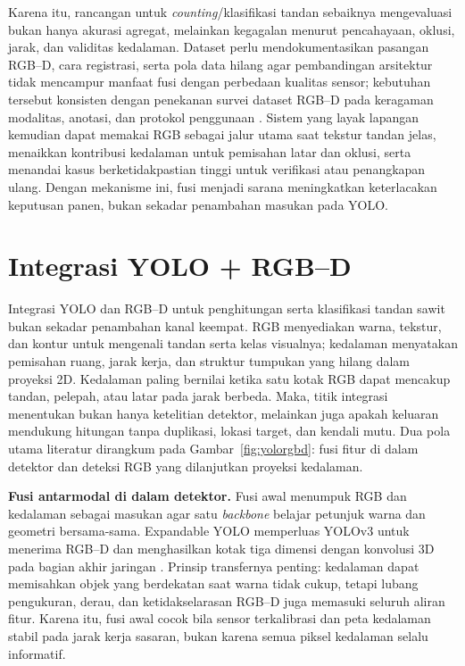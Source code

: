 Karena itu, rancangan untuk \textit{counting}/klasifikasi tandan sebaiknya mengevaluasi bukan hanya akurasi agregat, melainkan kegagalan menurut pencahayaan, oklusi, jarak, dan validitas kedalaman. Dataset perlu mendokumentasikan pasangan RGB--D, cara registrasi, serta pola data hilang agar pembandingan arsitektur tidak mencampur manfaat fusi dengan perbedaan kualitas sensor; kebutuhan tersebut konsisten dengan penekanan survei dataset RGB--D pada keragaman modalitas, anotasi, dan protokol penggunaan \cite{lopes2022rgbddatasets}. Sistem yang layak lapangan kemudian dapat memakai RGB sebagai jalur utama saat tekstur tandan jelas, menaikkan kontribusi kedalaman untuk pemisahan latar dan oklusi, serta menandai kasus berketidakpastian tinggi untuk verifikasi atau penangkapan ulang. Dengan mekanisme ini, fusi menjadi sarana meningkatkan keterlacakan keputusan panen, bukan sekadar penambahan masukan pada YOLO.

\section{Integrasi YOLO + RGB--D}\label{sec:yolorgbd}
Integrasi YOLO dan RGB--D untuk penghitungan serta klasifikasi tandan sawit bukan sekadar penambahan kanal keempat. RGB menyediakan warna, tekstur, dan kontur untuk mengenali tandan serta kelas visualnya; kedalaman menyatakan pemisahan ruang, jarak kerja, dan struktur tumpukan yang hilang dalam proyeksi 2D. Kedalaman paling bernilai ketika satu kotak RGB dapat mencakup tandan, pelepah, atau latar pada jarak berbeda. Maka, titik integrasi menentukan bukan hanya ketelitian detektor, melainkan juga apakah keluaran mendukung hitungan tanpa duplikasi, lokasi target, dan kendali mutu. Dua pola utama literatur dirangkum pada Gambar~\ref{fig:yolorgbd}: fusi fitur di dalam detektor dan deteksi RGB yang dilanjutkan proyeksi kedalaman.

\textbf{Fusi antarmodal di dalam detektor.} Fusi awal menumpuk RGB dan kedalaman sebagai masukan agar satu \textit{backbone} belajar petunjuk warna dan geometri bersama-sama. Expandable YOLO memperluas YOLOv3 untuk menerima RGB--D dan menghasilkan kotak tiga dimensi dengan konvolusi 3D pada bagian akhir jaringan \cite{takahashi2020expandableyolo}. Prinsip transfernya penting: kedalaman dapat memisahkan objek yang berdekatan saat warna tidak cukup, tetapi lubang pengukuran, derau, dan ketidakselarasan RGB--D juga memasuki seluruh aliran fitur. Karena itu, fusi awal cocok bila sensor terkalibrasi dan peta kedalaman stabil pada jarak kerja sasaran, bukan karena semua piksel kedalaman selalu informatif.

